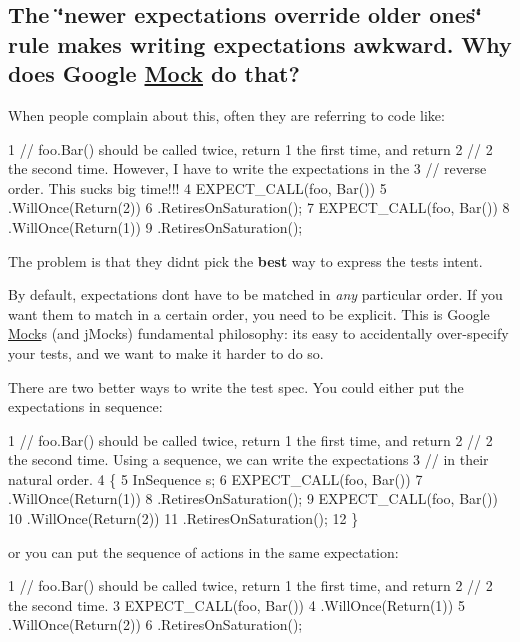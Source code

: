 \subsection*{The \char`\"{}newer expectations override older ones\char`\"{} rule makes writing expectations awkward. Why does Google \hyperlink{class_mock}{Mock} do that?}

When people complain about this, often they are referring to code like\+:


\begin{DoxyCode}
1 // foo.Bar() should be called twice, return 1 the first time, and return
2 // 2 the second time.  However, I have to write the expectations in the
3 // reverse order.  This sucks big time!!!
4 EXPECT\_CALL(foo, Bar())
5     .WillOnce(Return(2))
6     .RetiresOnSaturation();
7 EXPECT\_CALL(foo, Bar())
8     .WillOnce(Return(1))
9     .RetiresOnSaturation();
\end{DoxyCode}


The problem is that they didn\textquotesingle{}t pick the {\bfseries best} way to express the test\textquotesingle{}s intent.

By default, expectations don\textquotesingle{}t have to be matched in {\itshape any} particular order. If you want them to match in a certain order, you need to be explicit. This is Google \hyperlink{class_mock}{Mock}\textquotesingle{}s (and j\+Mock\textquotesingle{}s) fundamental philosophy\+: it\textquotesingle{}s easy to accidentally over-\/specify your tests, and we want to make it harder to do so.

There are two better ways to write the test spec. You could either put the expectations in sequence\+:


\begin{DoxyCode}
1 // foo.Bar() should be called twice, return 1 the first time, and return
2 // 2 the second time.  Using a sequence, we can write the expectations
3 // in their natural order.
4 \{
5   InSequence s;
6   EXPECT\_CALL(foo, Bar())
7       .WillOnce(Return(1))
8       .RetiresOnSaturation();
9   EXPECT\_CALL(foo, Bar())
10       .WillOnce(Return(2))
11       .RetiresOnSaturation();
12 \}
\end{DoxyCode}


or you can put the sequence of actions in the same expectation\+:


\begin{DoxyCode}
1 // foo.Bar() should be called twice, return 1 the first time, and return
2 // 2 the second time.
3 EXPECT\_CALL(foo, Bar())
4     .WillOnce(Return(1))
5     .WillOnce(Return(2))
6     .RetiresOnSaturation();
\end{DoxyCode}


